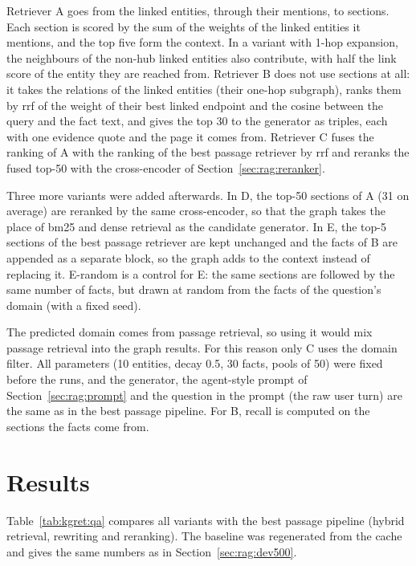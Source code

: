 Retriever A goes from the linked entities, through their mentions, to sections. Each
section is scored by the sum of the weights of the linked entities it mentions, and the
top five form the context. In a variant with 1-hop expansion, the neighbours of the
non-hub linked entities also contribute, with half the link score of the entity they
are reached from. Retriever B does not use sections at all: it takes the relations of
the linked entities (their one-hop subgraph), ranks them by \gls{rrf} of the weight of
their best linked endpoint and the cosine between the query and the fact text, and
gives the top 30 to the generator as triples, each with one evidence quote and the page
it comes from. Retriever C fuses the ranking of A with the ranking of the best passage
retriever by \gls{rrf} and reranks the fused top-50 with the cross-encoder of
Section~\ref{sec:rag:reranker}.

Three more variants were added afterwards. In D, the top-50 sections of A (31 on average)
are reranked by the same cross-encoder, so that the graph takes the place of \gls{bm25}
and dense retrieval as the candidate generator. In E, the top-5 sections of the best
passage retriever are kept unchanged and the facts of B are appended as a separate
block, so the graph adds to the context instead of replacing it. E-random is a control
for E: the same sections are followed by the same number of facts, but drawn at random
from the facts of the question's domain (with a fixed seed).

The predicted domain comes from passage retrieval, so using it would mix passage
retrieval into the graph results. For this reason only C uses the domain filter. All
parameters (10 entities, decay 0.5, 30 facts, pools of 50) were fixed before the runs,
and the generator, the agent-style prompt of Section~\ref{sec:rag:prompt} and the
question in the prompt (the raw user turn) are the same as in the best passage
pipeline. For B, recall is computed on the sections the facts come from.


\section{Results}\label{sec:kgret:results}

Table~\ref{tab:kgret:qa} compares all variants with the best passage pipeline (hybrid
retrieval, rewriting and reranking). The baseline was regenerated from the cache and
gives the same numbers as in Section~\ref{sec:rag:dev500}.

